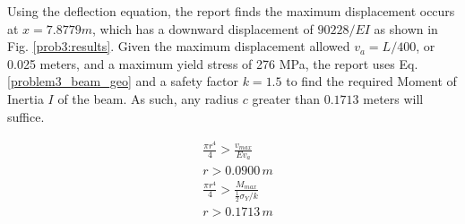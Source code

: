 \documentclass[a4paper]{article}
\begin{document}
Using the deflection equation, the report finds the maximum displacement occurs at $x = 7.8779 m$, which has a downward displacement of $90228/EI$ as shown in Fig. \ref{prob3:results}. Given the maximum displacement allowed $v_a = L/400$, or 0.025 meters, and a maximum yield stress of 276 MPa, the report uses Eq. \ref{problem3_beam_geo} and a safety factor $k=1.5$ to find the required Moment of Inertia $I$ of the beam. As such, any radius $c$ greater than $0.1713$ meters will suffice.

\begin{equation}
\begin{split}
& \frac{\pi r^4}{4} > \frac{v_{max}}{Ev_a} \\
& r > 0.0900\,m \\
& \frac{\pi r^4}{4} > \frac{M_{max}}{\frac{1}{2}\sigma_Y/ k}\\
& r > 0.1713\,m \\
\end{split}
\label{problem3_beam_geo}
\end{equation}
\end{document}

